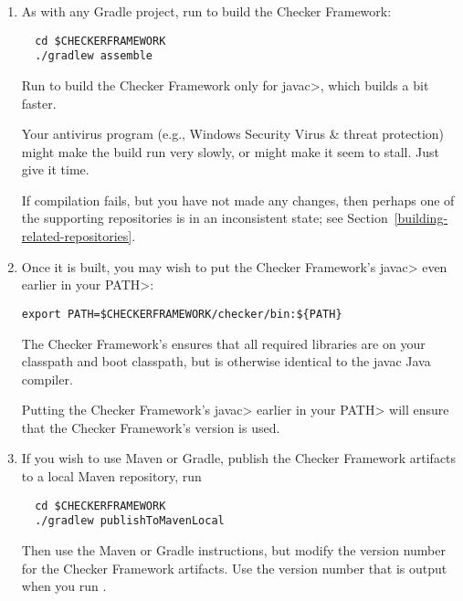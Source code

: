 

\begin{enumerate}

\item
As with any Gradle project, run  to build the Checker Framework:

\begin{Verbatim}
  cd $CHECKERFRAMEWORK
  ./gradlew assemble
\end{Verbatim}

Run  to build the Checker Framework only for
\<javac>, which builds a bit faster.

\noindent
Your antivirus program (e.g., Windows Security Virus \& threat protection)
might make the build run very slowly, or might make it seem to stall.  Just
give it time.

If compilation fails, but you have not made any changes, then perhaps one
of the supporting repositories is in an inconsistent state; see
Section~\ref{building-related-repositories}.

\item
Once it is built, you may wish to put the Checker Framework's \<javac>
even earlier in your \<PATH>:

\begin{Verbatim}
export PATH=$CHECKERFRAMEWORK/checker/bin:${PATH}
\end{Verbatim}

The Checker Framework's  ensures that all required
libraries are on your classpath and boot classpath, but is otherwise
identical to the javac Java compiler.

Putting the Checker Framework's \<javac> earlier in your \<PATH> will
ensure that the Checker Framework's version is used.

\item
If you wish to use Maven or Gradle, publish the Checker Framework artifacts to a local Maven repository, run
\begin{Verbatim}
  cd $CHECKERFRAMEWORK
  ./gradlew publishToMavenLocal
\end{Verbatim}
Then use the Maven or Gradle instructions, but modify the version number for the Checker Framework artifacts.
Use the version number that is output when you run .


\end{enumerate}
